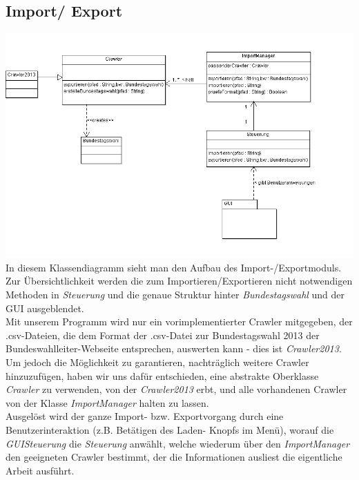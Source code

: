 \documentclass[10pt,a4paper]{article}
\begin{document}
\subsection{Import/ Export}
\includegraphics[scale=0.5]{Import-Export Ausschnitt.png} \\
In diesem Klassendiagramm sieht man den Aufbau des Import-/Exportmoduls. Zur Übersichtlichkeit werden die zum Importieren/Exportieren nicht notwendigen Methoden in \textit{Steuerung} und die genaue Struktur hinter \textit{Bundestagswahl} und der GUI ausgeblendet. \\
Mit unserem Programm wird nur ein vorimplementierter Crawler mitgegeben, der .csv-Dateien, die dem Format der .csv-Datei zur Bundestagswahl 2013 der Bundeswahlleiter-Webseite entsprechen, auswerten kann - dies ist \textit{Crawler2013}. Um jedoch die Möglichkeit zu garantieren, nachträglich weitere Crawler hinzuzufügen, haben wir uns dafür entschieden, eine abstrakte Oberklasse \textit{Crawler} zu verwenden, von der \textit{Crawler2013} erbt, und alle vorhandenen Crawler von der Klasse \textit{ImportManager} halten zu lassen. \\ Ausgelöst wird der ganze Import- bzw. Exportvorgang durch eine Benutzerinteraktion (z.B. Betätigen des Laden- Knopfs im Menü), worauf die \textit{GUISteuerung} die \textit{Steuerung} anwählt, welche wiederum über den \textit{ImportManager} den geeigneten Crawler bestimmt, der die Informationen ausliest die eigentliche Arbeit ausführt.
\end{document}
